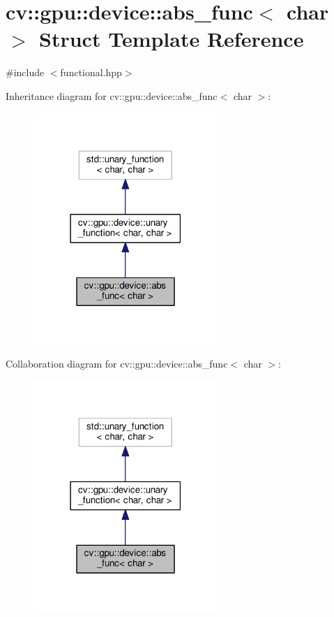 \hypertarget{structcv_1_1gpu_1_1device_1_1abs__func_3_01char_01_4}{\section{cv\-:\-:gpu\-:\-:device\-:\-:abs\-\_\-func$<$ char $>$ Struct Template Reference}
\label{structcv_1_1gpu_1_1device_1_1abs__func_3_01char_01_4}
}


{\ttfamily \#include $<$functional.\-hpp$>$}



Inheritance diagram for cv\-:\-:gpu\-:\-:device\-:\-:abs\-\_\-func$<$ char $>$\-:\nopagebreak
\begin{figure}[H]
\begin{center}
\leavevmode
\includegraphics[width=198pt]{structcv_1_1gpu_1_1device_1_1abs__func_3_01char_01_4__inherit__graph}
\end{center}
\end{figure}


Collaboration diagram for cv\-:\-:gpu\-:\-:device\-:\-:abs\-\_\-func$<$ char $>$\-:\nopagebreak
\begin{figure}[H]
\begin{center}
\leavevmode
\includegraphics[width=198pt]{structcv_1_1gpu_1_1device_1_1abs__func_3_01char_01_4__coll__graph}
\end{center}
\end{figure}
